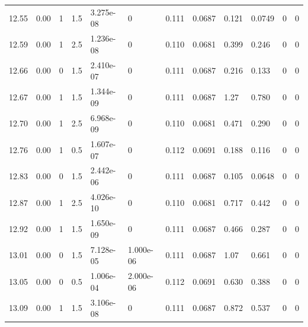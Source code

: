 \documentclass[preview]{standalone}
\begin{document}
{{{{{{{\begin{tabular}{L{1.2cm}C{1.2cm} C{0.3cm}C{0.5cm} C{1.4cm}C{1.4cm} C{1.4cm}C{1.4cm} C{1.6cm}C{1.6cm} C{1.6cm}C{1.6cm}}
  12.55  &  0.00  & 1     & 1.5 &  3.275e-08  & 0  &  0.111&   0.0687& 0.121 & 0.0749   &  0 & 0  \\ 
  12.59  &  0.00  & 1     & 2.5 &  1.236e-08  & 0  &  0.110&   0.0681& 0.399 & 0.246   &  0 & 0  \\ 
  12.66  &  0.00  & 0     & 1.5 &  2.410e-07  & 0  &  0.111&   0.0687& 0.216 & 0.133   &  0 & 0  \\ 
  12.67  &  0.00  & 1     & 1.5 &  1.344e-09  & 0  &  0.111&   0.0687& 1.27 & 0.780   &  0 & 0  \\ 
  12.70  &  0.00  & 1     & 2.5 &  6.968e-09  & 0  &  0.110&   0.0681& 0.471 & 0.290   &  0 & 0  \\ 
  12.76  &  0.00  & 1     & 0.5 &  1.607e-07  & 0  &  0.112&   0.0691& 0.188 & 0.116   &  0 & 0  \\ 
  12.83  &  0.00  & 0     & 1.5 &  2.442e-06  & 0  &  0.111&   0.0687& 0.105 & 0.0648   &  0 & 0  \\ 
  12.87  &  0.00  & 1     & 2.5 &  4.026e-10  & 0  &  0.110&   0.0681& 0.717 & 0.442   &  0 & 0  \\ 
  12.92  &  0.00  & 1     & 1.5 &  1.650e-09  & 0  &  0.111&   0.0687& 0.466 & 0.287   &  0 & 0  \\ 
  13.01  &  0.00  & 0     & 1.5 &  7.128e-05  & 1.000e-06  &  0.111&   0.0687& 1.07 & 0.661   &  0 & 0  \\ 
  13.05  &  0.00  & 0     & 0.5 &  1.006e-04  & 2.000e-06  &  0.112&   0.0691& 0.630 & 0.388   &  0 & 0  \\ 
  13.09  &  0.00  & 1     & 1.5 &  3.106e-08  & 0  &  0.111&   0.0687& 0.872 & 0.537   &  0 & 0  \\ 
\hline 
\end{tabular} 

}}}}}}}
\end{document}
